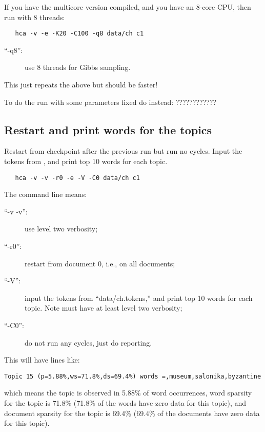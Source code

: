 \documentclass[a4paper,english]{article}
\begin{document}
If you have the multicore version compiled, 
and you have an 8-core CPU, then run with 8 threads:
\begin{verbatim}
   hca -v -e -K20 -C100 -q8 data/ch c1
\end{verbatim}
\begin{description}
\item[``-q8'':] use 8 threads for Gibbs sampling.
\end{description}
This just repeats the above but should be faster!

To do the run with some parameters fixed do instead:
????????????

\subsection{Restart and print words for the topics}
Restart from checkpoint after the previous run but run no cycles.
Input the tokens from
, and print top 10 words for each topic.
\begin{verbatim}
   hca -v -v -r0 -e -V -C0 data/ch c1
\end{verbatim}
The command line means:
\begin{description}
\item[``-v -v'':] use level two verbosity;
\item[``-r0'':] restart from document 0, i.e., on all documents;
\item[``-V'':] input the tokens from
``data/ch.tokens,'' and print top 10 words for each topic.
Note must have at least level two verbosity;
\item[``-C0'':] do not run any cycles, just do reporting.
\end{description}
This will have lines like:
\begin{verbatim}
Topic 15 (p=5.88%,ws=71.8%,ds=69.4%) words =,museum,salonika,byzantine
\end{verbatim}
which means the topic is observed in 5.88\% of word occurrences,
word sparsity for the topic is 71.8\%
(71.8\% of the words have zero data for this topic),
and document sparsity for the topic is 69.4\%
(69.4\% of the documents have zero data for this topic).
\end{document}
